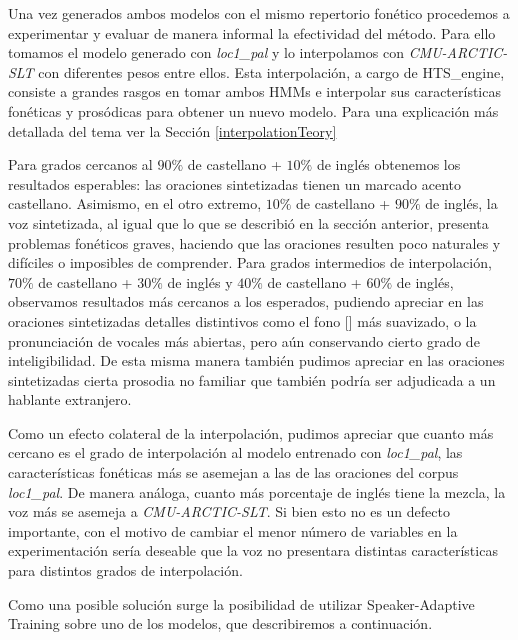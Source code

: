 Una vez generados ambos modelos con el mismo repertorio fonético procedemos a experimentar y evaluar de manera informal la efectividad del método. Para ello tomamos el modelo generado con \textit{loc1\_pal} y lo interpolamos con \textit{CMU-ARCTIC-SLT} con diferentes pesos entre ellos. Esta interpolación, a cargo de HTS\_engine, consiste a grandes rasgos en tomar ambos HMMs e interpolar sus características fonéticas y prosódicas para obtener un nuevo modelo. Para una explicación más detallada del tema ver la Sección \ref{interpolationTeory}

Para grados cercanos al $90\%$ de castellano + $10\%$ de inglés obtenemos los resultados esperables: las oraciones sintetizadas tienen un marcado acento castellano. Asimismo, en el otro extremo, $10\%$ de castellano + $90\%$ de inglés, la voz sintetizada, al igual que lo que se describió en la sección anterior, presenta problemas fonéticos graves, haciendo que las oraciones resulten poco naturales y difíciles o imposibles de comprender. Para grados intermedios de interpolación, $70\%$ de castellano + $30\%$ de inglés y $40\%$ de castellano + $60\%$ de inglés, observamos resultados más cercanos a los esperados, pudiendo apreciar en las oraciones sintetizadas detalles distintivos como el fono [] más suavizado, o la pronunciación de vocales más abiertas, pero aún conservando cierto grado de inteligibilidad. De esta misma manera también pudimos apreciar en las oraciones sintetizadas cierta prosodia no familiar que también podría ser adjudicada a un hablante extranjero.  

Como un efecto colateral de la interpolación, pudimos apreciar que cuanto más cercano es el grado de interpolación al modelo entrenado con \textit{loc1\_pal}, las características fonéticas más se asemejan a las de las oraciones del corpus \textit{loc1\_pal}. De manera análoga, cuanto más porcentaje de inglés tiene la mezcla, la voz más se asemeja a \textit{CMU-ARCTIC-SLT}. Si bien esto no es un defecto importante, con el motivo de cambiar el menor número de variables en la experimentación sería deseable que la voz no presentara distintas características para distintos grados de interpolación.

Como una posible solución surge la posibilidad de utilizar Speaker-Adaptive Training sobre uno de los modelos, que describiremos a continuación.